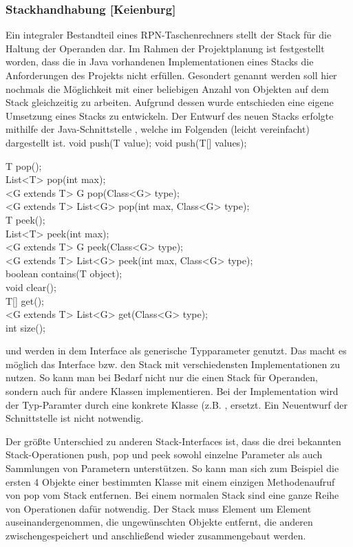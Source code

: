 \subsubsection{Stackhandhabung [Keienburg]}

Ein integraler Bestandteil eines RPN-Taschenrechners stellt der Stack für die Haltung der Operanden dar. Im Rahmen der Projektplanung ist festgestellt worden, dass die in Java vorhandenen Implementationen eines Stacks die Anforderungen des Projekts nicht erfüllen. Gesondert genannt werden soll hier nochmals die Möglichkeit mit einer beliebigen Anzahl von Objekten auf dem Stack gleichzeitig zu arbeiten. Aufgrund dessen wurde entschieden eine eigene Umsetzung eines Stacks zu entwickeln. Der Entwurf des neuen Stacks erfolgte mithilfe der Java-Schnittstelle , welche im Folgenden (leicht vereinfacht) dargestellt ist.
void push(T value);
void push(T[] values);


T pop();\\
List<T> pop(int max);\\
<G extends T> G pop(Class<G> type);\\
<G extends T> List<G> pop(int max, Class<G> type);\\
T peek();\\
List<T> peek(int max); \\
<G extends T> G peek(Class<G> type); \\
<G extends T> List<G> peek(int max, Class<G> type); \\
boolean contains(T object); \\
void clear(); \\
T[] get(); \\
<G extends T> List<G> get(Class<G> type);\\
int size();

 und  werden in dem Interface als generische Typparameter genutzt. Das macht es möglich das Interface bzw. den Stack mit verschiedensten Implementationen zu nutzen. So kann man bei Bedarf nicht nur die einen Stack für Operanden, sondern auch für andere Klassen implementieren. Bei der Implementation wird der Typ-Paramter  durch eine konkrete Klasse (z.B. , ersetzt. Ein Neuentwurf der Schnittstelle ist nicht notwendig. 

Der größte Unterschied zu anderen Stack-Interfaces ist, dass die drei bekannten Stack-Operationen push, pop und peek sowohl einzelne Parameter als auch Sammlungen von Parametern unterstützen. So kann man sich zum Beispiel die ersten 4 Objekte einer bestimmten Klasse mit einem einzigen Methodenaufruf von pop vom Stack entfernen. Bei einem normalen Stack sind eine ganze Reihe von Operationen dafür notwendig. Der Stack muss Element um Element auseinandergenommen, die ungewünschten Objekte entfernt, die anderen zwischengespeichert und anschließend wieder zusammengebaut werden.


